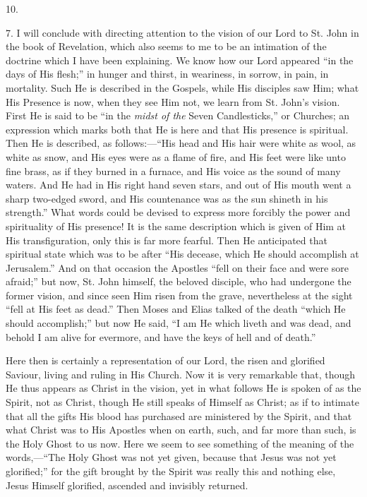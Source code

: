 10.

7. I will conclude with directing attention to the vision of our
Lord to St. John in the book of Revelation, which also seems to me to
be an intimation of the doctrine which I have been explaining. We know
how our Lord appeared ``in the days of His flesh;'' in hunger
and thirst, in weariness, in sorrow, in pain, in mortality. Such He is
described in the Gospels, while His disciples saw Him; what His
Presence is now, when they see Him not, we learn from St. John's
vision. First He is said to be ``in the \emph{midst of the} Seven
Candlesticks,'' or Churches; an expression which marks both that
He is here and that His presence is spiritual. Then He is described,
as follows:—``His head and His hair were white as wool, as white
as snow, and His eyes were as a flame of fire, and His feet were like
unto fine brass, as if they burned in a furnace, and His voice as the
sound of many waters. And He had in His right hand seven stars, and
out of His mouth went a sharp two-edged sword, and His countenance was
as the sun shineth in his strength.'' What words could be devised
to express more forcibly the power and spirituality of His presence!
It is the same description which is given of Him at His
transfiguration, only this is far more fearful. Then He anticipated
that spiritual state which was to be after ``His decease, which He
should accomplish at Jerusalem.'' And on that occasion the
Apostles ``fell on their face and were sore afraid;'' but now,
St. John himself, the beloved disciple, who had undergone the
former vision, and since seen Him risen from the grave, nevertheless
at the sight ``fell at His feet as dead.'' Then Moses and
Elias talked of the death ``which He should accomplish;'' but
now He said, ``I am He which liveth and was dead, and behold I am
alive for evermore, and have the keys of hell and of death.''

Here then is certainly a representation of our Lord, the risen and
glorified Saviour, living and ruling in His Church. Now it is very
remarkable that, though He thus appears as Christ in the vision, yet
in what follows He is spoken of as the Spirit, not as Christ, though
He still speaks of Himself as Christ; as if to intimate that all the
gifts His blood has purchased are ministered by the Spirit, and that
what Christ was to His Apostles when on earth, such, and far more than
such, is the Holy Ghost to us now. Here we seem to see something of
the meaning of the words,—``The Holy Ghost was not yet given,
because that Jesus was not yet glorified;'' for the gift brought
by the Spirit was really this and nothing else, Jesus Himself
glorified, ascended and invisibly returned.

